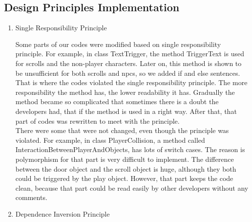 \documentclass[12pt, a4paper]{report}
\begin{document}
		\subsection{Design Principles Implementation}
			\begin{enumerate}
				\item Single Responsibility Principle


				Some parts of our codes were modified based on single responsibility principle. For example, in class TextTrigger, the method TriggerText is used for scrolls and the non-player characters. Later on, this method is shown to be unsufficient for both scrolls and npcs, so we added if and else sentences. That is where the codes violated the single responsibility principle. The more responsibility the method has, the lower readability it has. Gradually the method became so complicated that sometimes there is a doubt the developers had, that if the method is used in a right way. After that, that part of codes was rewritten to meet with the principle. \\
				There were some that were not changed, even though the principle was violated. For example, in class PlayerCollision, a method called InteractionBetweenPlayerAndObjects, has lots of switch cases. The reason is polymorphism for that part is very difficult to implement. The difference between the door object and the scroll object is huge, although they both could be triggered by the play object. However, that part keeps the code clean, because that part could be read easily by other developers without any comments. \\

			\item Dependence Inversion Principle



\end{enumerate}
\end{document}
